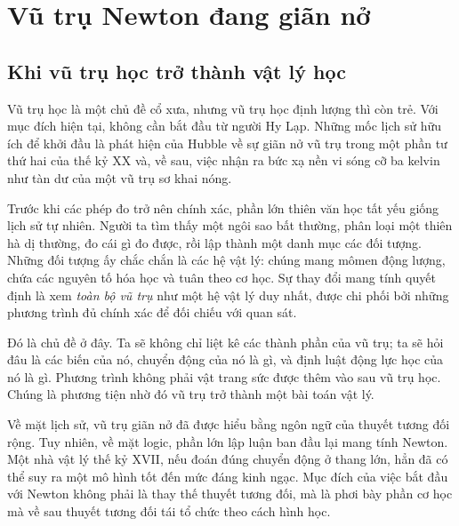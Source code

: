 \chapter{Vũ trụ Newton đang giãn nở}


\section{Khi vũ trụ học trở thành vật lý học}

Vũ trụ học là một chủ đề cổ xưa, nhưng vũ trụ học định lượng thì còn trẻ. Với mục đích hiện tại, không cần bắt đầu từ người Hy Lạp. Những mốc lịch sử hữu ích để khởi đầu là phát hiện của Hubble về sự giãn nở vũ trụ trong một phần tư thứ hai của thế kỷ XX và, về sau, việc nhận ra bức xạ nền vi sóng cỡ ba kelvin như tàn dư của một vũ trụ sơ khai nóng.

Trước khi các phép đo trở nên chính xác, phần lớn thiên văn học tất yếu giống lịch sử tự nhiên. Người ta tìm thấy một ngôi sao bất thường, phân loại một thiên hà dị thường, đo cái gì đo được, rồi lập thành một danh mục các đối tượng. Những đối tượng ấy chắc chắn là các hệ vật lý: chúng mang mômen động lượng, chứa các nguyên tố hóa học và tuân theo cơ học. Sự thay đổi mang tính quyết định là xem \emph{toàn bộ vũ trụ} như một hệ vật lý duy nhất, được chi phối bởi những phương trình đủ chính xác để đối chiếu với quan sát.

Đó là chủ đề ở đây. Ta sẽ không chỉ liệt kê các thành phần của vũ trụ; ta sẽ hỏi đâu là các biến của nó, chuyển động của nó là gì, và định luật động lực học của nó là gì. Phương trình không phải vật trang sức được thêm vào sau vũ trụ học. Chúng là phương tiện nhờ đó vũ trụ trở thành một bài toán vật lý.

Về mặt lịch sử, vũ trụ giãn nở đã được hiểu bằng ngôn ngữ của thuyết tương đối rộng. Tuy nhiên, về mặt logic, phần lớn lập luận ban đầu lại mang tính Newton. Một nhà vật lý thế kỷ XVII, nếu đoán đúng chuyển động ở thang lớn, hẳn đã có thể suy ra một mô hình tốt đến mức đáng kinh ngạc. Mục đích của việc bắt đầu với Newton không phải là thay thế thuyết tương đối, mà là phơi bày phần cơ học mà về sau thuyết tương đối tái tổ chức theo cách hình học.

